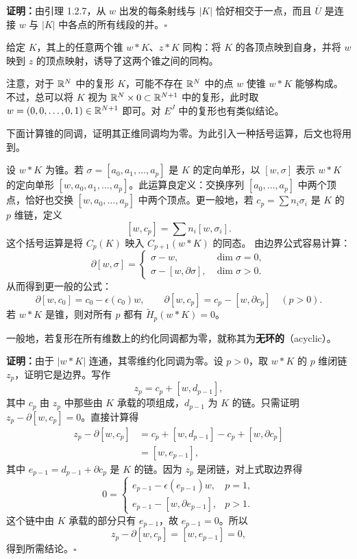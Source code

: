 \noindent\textbf{证明：}由引理 1.2.7，从 $w$ 出发的每条射线与 $|K|$ 恰好相交于一点，而且 $\overline U$ 是连接 $w$ 与 $|K|$ 中各点的所有线段的并。\hfill$\square$

给定 $K$，其上的任意两个锥 $w*K$、$z*K$ 同构：将 $K$ 的各顶点映到自身，并将 $w$ 映到 $z$ 的顶点映射，诱导了这两个锥之间的同构。

注意，对于 $\mathbb{R}^N$ 中的复形 $K$，可能不存在 $\mathbb{R}^N$ 中的点 $w$ 使锥 $w*K$ 能够构成。不过，总可以将 $K$ 视为 $\mathbb{R}^N\times0\subset\mathbb{R}^{N+1}$ 中的复形，此时取 $w=(0,0,\ldots,0,1)\in\mathbb{R}^{N+1}$ 即可。对 $E^J$ 中的复形也有类似结论。

下面计算锥的同调，证明其正维同调均为零。为此引入一种括号运算，后文也将用到。

设 $w*K$ 为锥。若 $\sigma=[a_0,a_1,\ldots,a_p]$ 是 $K$ 的定向单形，以 $[w,\sigma]$ 表示 $w*K$ 的定向单形 $[w,a_0,a_1,\ldots,a_p]$。此运算良定义：交换序列 $[a_0,\ldots,a_p]$ 中两个顶点，恰好也交换 $[w,a_0,\ldots,a_p]$ 中两个顶点。更一般地，若 $c_p=\sum n_i\sigma_i$ 是 $K$ 的 $p$ 维链，定义
\[
[w,c_p]=\sum n_i[w,\sigma_i].
\]
这个括号运算是将 $C_p(K)$ 映入 $C_{p+1}(w*K)$ 的同态。
由边界公式容易计算：
\[
\partial[w,\sigma]=\begin{cases}
\sigma-w,&\dim\sigma=0,\\
\sigma-[w,\partial\sigma],&\dim\sigma>0.
\end{cases}
\]
从而得到更一般的公式：
\[
\partial[w,c_0]=c_0-\epsilon(c_0)w,\qquad
\partial[w,c_p]=c_p-[w,\partial c_p]\quad(p>0).
\]
若 $w*K$ 是锥，则对所有 $p$ 都有 $\widetilde H_p(w*K)=0$。

一般地，若复形在所有维数上的约化同调都为零，就称其为\textbf{无环的}（acyclic）。

\noindent\textbf{证明：}由于 $|w*K|$ 连通，其零维约化同调为零。设 $p>0$，取 $w*K$ 的 $p$ 维闭链 $z_p$，证明它是边界。写作
\[
z_p=c_p+[w,d_{p-1}],
\]
其中 $c_p$ 由 $z_p$ 中那些由 $K$ 承载的项组成，$d_{p-1}$ 为 $K$ 的链。只需证明 $z_p-\partial[w,c_p]=0$。直接计算得
\[
\begin{aligned}
z_p-\partial[w,c_p]
&=c_p+[w,d_{p-1}]-c_p+[w,\partial c_p]\\
&=[w,e_{p-1}],
\end{aligned}
\]
其中 $e_{p-1}=d_{p-1}+\partial c_p$ 是 $K$ 的链。因为 $z_p$ 是闭链，对上式取边界得
\[
0=\begin{cases}
e_{p-1}-\epsilon(e_{p-1})w,&p=1,\\
e_{p-1}-[w,\partial e_{p-1}],&p>1.
\end{cases}
\]
这个链中由 $K$ 承载的部分只有 $e_{p-1}$，故 $e_{p-1}=0$。所以
\[
z_p-\partial[w,c_p]=[w,e_{p-1}]=0,
\]
得到所需结论。\hfill$\square$

